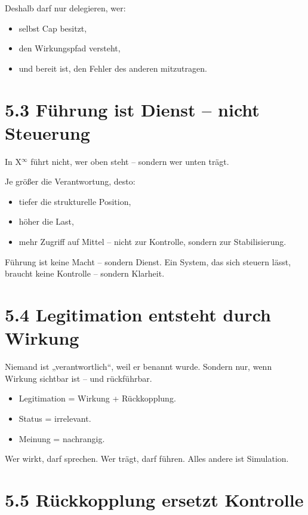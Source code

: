 \documentclass[12pt,a4paper]{book}
\begin{document}
Deshalb darf nur delegieren, wer:

\begin{itemize}
    \item selbst Cap besitzt,
    \item den Wirkungspfad versteht,
    \item und bereit ist, den Fehler des anderen mitzutragen.
\end{itemize}

\section*{5.3 Führung ist Dienst – nicht Steuerung}

In X$^\infty$ führt nicht, wer oben steht – sondern wer unten trägt.

Je größer die Verantwortung, desto:

\begin{itemize}
    \item tiefer die strukturelle Position,
    \item höher die Last,
    \item mehr Zugriff auf Mittel – nicht zur Kontrolle, sondern zur Stabilisierung.
\end{itemize}

Führung ist keine Macht – sondern Dienst.  
Ein System, das sich steuern lässt, braucht keine Kontrolle – sondern Klarheit.

\section*{5.4 Legitimation entsteht durch Wirkung}

Niemand ist „verantwortlich“, weil er benannt wurde.  
Sondern nur, wenn Wirkung sichtbar ist – und rückführbar.

\begin{itemize}
    \item Legitimation = Wirkung + Rückkopplung.
    \item Status = irrelevant.
    \item Meinung = nachrangig.
\end{itemize}

Wer wirkt, darf sprechen. Wer trägt, darf führen.  
Alles andere ist Simulation.

\section*{5.5 Rückkopplung ersetzt Kontrolle}
\end{document}
